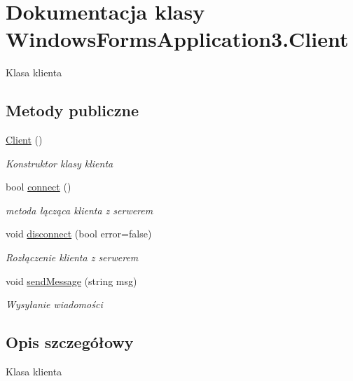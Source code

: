 \hypertarget{class_windows_forms_application3_1_1_client}{}\section{Dokumentacja klasy Windows\+Forms\+Application3.\+Client}
\label{class_windows_forms_application3_1_1_client}


Klasa klienta  


\subsection*{Metody publiczne}
\begin{DoxyCompactItemize}
\item 
\hyperlink{class_windows_forms_application3_1_1_client_a3ac0d5af309fb79e24fc58bd4d17a2b4}{Client} ()
\begin{DoxyCompactList}\small\item\em Konstruktor klasy klienta \end{DoxyCompactList}\item 
bool \hyperlink{class_windows_forms_application3_1_1_client_a9f9dfff8bba1fe20ca6d3da7cd706dd1}{connect} ()
\begin{DoxyCompactList}\small\item\em metoda łącząca klienta z serwerem \end{DoxyCompactList}\item 
void \hyperlink{class_windows_forms_application3_1_1_client_a136f39388b24a7e5bc498baefecd006d}{disconnect} (bool error=false)
\begin{DoxyCompactList}\small\item\em Rozłączenie klienta z serwerem \end{DoxyCompactList}\item 
void \hyperlink{class_windows_forms_application3_1_1_client_afcd6a12a5559cce41c20dba36bce0bc4}{send\+Message} (string msg)
\begin{DoxyCompactList}\small\item\em Wysyłanie wiadomości \end{DoxyCompactList}\end{DoxyCompactItemize}


\subsection{Opis szczegółowy}
Klasa klienta 



